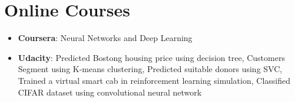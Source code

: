 \documentclass[letterpaper,10pt]{article}
\newcommand{\resumeItem}[2]{
  \item\small{
    \textbf{#1}{: #2 \vspace{-2pt}}
  }
}
\newcommand{\resumeSubItem}[2]{\resumeItem{#1}{#2}\vspace{-4pt}}
\newcommand{\resumeSubHeadingListStart}{\begin{itemize}[leftmargin=*]}
\newcommand{\resumeSubHeadingListEnd}{\end{itemize}}
\begin{document}
\section{Online Courses}
  \resumeSubHeadingListStart
    \resumeSubItem{Coursera}
    {Neural Networks and Deep Learning}
    \resumeSubItem{Udacity}
    {Predicted Bostong housing price using decision tree, Customers Segment using K-means clustering, Predicted suitable donors using SVC, Trained a virtual smart cab in reinforcement learning simulation, Classified CIFAR dataset using convolutional neural network}
  \resumeSubHeadingListEnd
%


\end{document}
